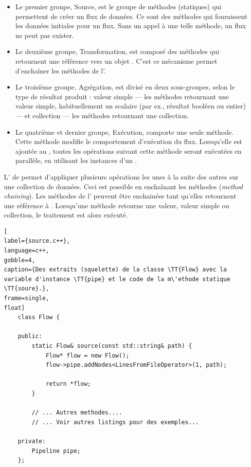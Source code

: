 \begin{itemize}

\item Le premier groupe, Source, est le groupe de méthodes (statiques) qui permettent de créer un flux de donn\'ees. Ce sont des m\'ethodes qui fournissent les donn\'ees initiales pour un flux. Sans un appel \`a une telle m\'ethode, un flux ne peut pas exister. 

\item Le deuxi\`eme groupe, Transformation, est composé des m\'ethodes qui retournent une r\'ef\'erence vers un objet . C'est ce m\'ecanisme permet d'encha\^iner les m\'ethodes de l'.

\item Le troisi\`eme groupe, Agr\'egation, est divis\'e en deux sous-groupes, selon le type de r\'esultat produit : valeur simple --- les m\'ethodes retournant une valeur simple, habituellement un scalaire (par ex., r\'esultat bool\'een ou entier) --- et collection --- les m\'ethodes retournant une collection.

\item Le quatrième et dernier groupe, Exécution, comporte une seule m\'ethode. Cette m\'ethode modifie le comportement d'ex\'ecution du flux. Lorsqu'elle est ajout\'ee au  , toutes les op\'erations suivant cette m\'ethode seront ex\'ecut\'ees en parall\`ele, en utilisant les instances d'un  .

\end{itemize}

L' de  permet d'appliquer plusieurs op\'erations les unes à la suite des autres sur une collection de donn\'ees. Ceci est possible en encha\^inant les m\'ethodes (\emph{method chaining}). Les m\'ethodes de l' peuvent \^etre enchain\'ees tant qu'elles retournent une r\'ef\'erence \`a . Lorsqu'une m\'ethode retourne une valeur, valeur simple ou collection, le traitement est alors ex\'ecut\'e. 



\begin{lstlisting}[
label={source.c++},
language=c++,
gobble=4,
caption={Des extraits (squelette) de la classe \TT{Flow} avec la variable d'instance \TT{pipe} et le code de la m\'ethode statique \TT{soure}.},
frame=single,
float]
    class Flow {

    public:
        static Flow& source(const std::string& path) {
            Flow* flow = new Flow();
            flow->pipe.addNodes<LinesFromFileOperator>(1, path);

            return *flow;
        }

        // ... Autres methodes....
        // ... Voir autres listings pour des exemples...

    private:
        Pipeline pipe;
    };
\end{lstlisting}


